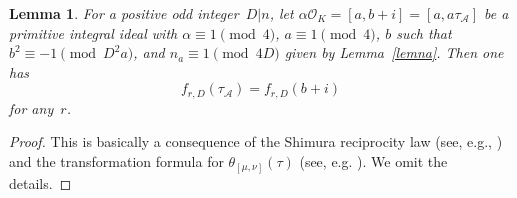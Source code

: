 \documentclass[11pt, reqno]{amsart}
\theoremstyle{plain}
\newtheorem{corollary}[theorem]{Corollary}
\newtheorem{lemma}[theorem]{Lemma}
\theoremstyle{definition}
\numberwithin{equation}{section}
\begin{document}
\begin{lemma}\label{shimuraff}
For a positive odd integer~$D|n$, let $\alpha\mathcal{O}_{K}=[a,b+i]=[a,a\tau_{\mathcal{A}}]$ be a primitive integral ideal with $\alpha\equiv1\pmod{4}$,  $a\equiv1\pmod{4}$, $b$  such that $b^{2}\equiv-1\pmod{D^{2}a}$, and $n_{a}\equiv1\pmod{4D}$ given by Lemma~\ref{lemna}. Then one has
$$
f_{r,D}(\tau_{\mathcal{A}})=f_{r,D}(b+i)
$$
for any~$r$.
\end{lemma}

\begin{proof}
    This is basically a consequence of the Shimura reciprocity law (see, e.g., \cite[Appendix]{R}) and the transformation formula for $\theta_{[\mu,\nu]}(\tau)$ (see, e.g. \cite{FK}). We omit the details.
\end{proof}

\end{document}
